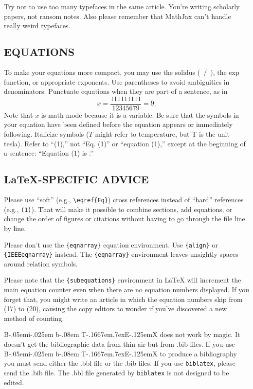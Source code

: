 \documentclass{IEEEoj}
\def\BibTeX{{\rm B\kern-.05em{\sc i\kern-.025em b}\kern-.08em
    T\kern-.1667em\lower.7ex\hbox{E}\kern-.125emX}}
\begin{document}
Try not to use too many typefaces in the same article. You're writing
scholarly papers, not ransom notes. Also please remember that MathJax
can't handle really weird typefaces.

\subsection{EQUATIONS}
To make your equations more 
compact, you may use the solidus (~/~), the exp function, or appropriate 
exponents. Use parentheses to avoid ambiguities in denominators. Punctuate 
equations when they are part of a sentence, as in
\begin{equation}
\label{eq1}
x=\frac{111111111}{12345679}=9 .
\end{equation}
Note that $x$ is math mode because it is a variable. 
Be sure that the symbols in your equation have been defined before the 
equation appears or immediately following. Italicize symbols ($T$ might refer 
to temperature, but T is the unit tesla). Refer to ``(1),'' not ``Eq. (1)'' 
or ``equation (1),'' except at the beginning of a sentence: ``Equation (1) 
is \textellipsis .''

\subsection{\LaTeX-SPECIFIC ADVICE}

Please use ``soft'' (e.g., \verb|\eqref{Eq}|) cross references instead
of ``hard'' references (e.g., \verb|(1)|). That will make it possible
to combine sections, add equations, or change the order of figures or
citations without having to go through the file line by line.

Please don't use the \verb|{eqnarray}| equation environment. Use
\verb|{align}| or \verb|{IEEEeqnarray}| instead. The \verb|{eqnarray}|
environment leaves unsightly spaces around relation symbols.

Please note that the \verb|{subequations}| environment in {\LaTeX}
will increment the main equation counter even when there are no
equation numbers displayed. If you forget that, you might write an
article in which the equation numbers skip from (17) to (20), causing
the copy editors to wonder if you've discovered a new method of
counting.

{\BibTeX} does not work by magic. It doesn't get the bibliographic
data from thin air but from .bib files. If you use {\BibTeX} to produce a
bibliography you must send either the .bbl file or the .bib files.
If you use \texttt{biblatex}, please send the .bib file. The .bbl file
generated by \texttt{biblatex} is not designed to be edited.
\end{document}
